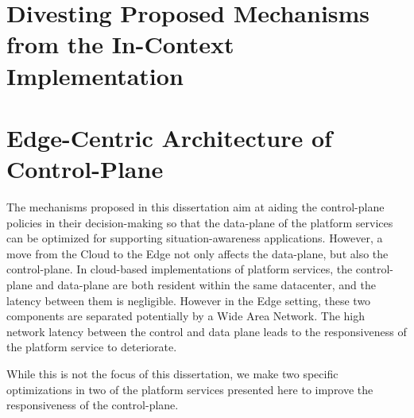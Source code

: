 \section{Divesting Proposed Mechanisms from the In-Context Implementation}

\section{Edge-Centric Architecture of Control-Plane}

The mechanisms proposed in this dissertation aim at aiding the control-plane policies in their decision-making so that the data-plane of the platform services can be optimized for supporting situation-awareness applications. However, a move from the Cloud to the Edge not only affects the data-plane, but also the control-plane. In cloud-based implementations of platform services, the control-plane and data-plane are both resident within the same datacenter, and the latency between them is negligible. However in the Edge setting, these two components are separated potentially by a Wide Area Network. The high network latency between the control and data plane leads to the responsiveness of the platform service to deteriorate.
\par While this is not the focus of this dissertation, we make two specific optimizations in two of the platform services presented here to improve the responsiveness of the control-plane. 

